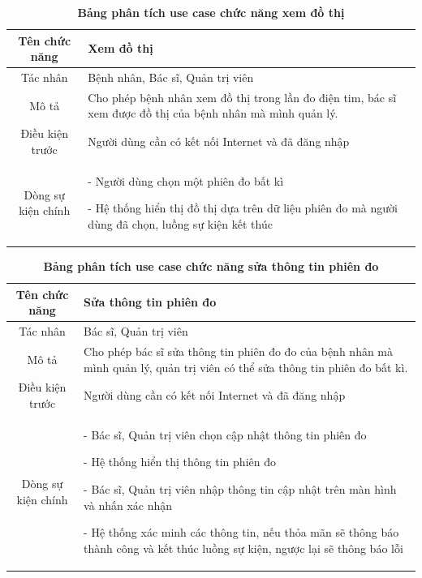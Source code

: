   \begin{table}[H]
    \caption{\bfseries \fontsize{12pt}{0pt}\selectfont Bảng phân tích use case chức năng xem đồ thị}
    \centering
    \begin{tabularx}{0.9\textwidth}{|c|X|}
      \hline
      \textbf{Tên chức năng} & \textbf{Xem đồ thị} \\
      \hline
      Tác nhân & Bệnh nhân, Bác sĩ, Quản trị viên \\
      \hline
      Mô tả & Cho phép bệnh nhân xem đồ thị trong lần đo điện tim, bác sĩ xem được đồ thị của bệnh nhân
      mà mình quản lý.\\
      \hline
      Điều kiện trước & Người dùng cần có kết nối Internet và đã đăng nhập \\
      \hline
      Dòng sự kiện chính & 
        - Người dùng chọn một phiên đo bất kì

        - Hệ thống hiển thị đồ thị dựa trên dữ liệu phiên đo mà người dùng đã chọn, luồng sự kiện 
        kết thúc        
        \\
      \hline
    \end{tabularx}
  \end{table}
  \begin{table}[H]
    \caption{\bfseries \fontsize{12pt}{0pt}\selectfont Bảng phân tích use case chức năng sửa thông tin phiên đo}
    \centering
    \begin{tabularx}{0.9\textwidth}{|c|X|}
      \hline
      \textbf{Tên chức năng} & \textbf{Sửa thông tin phiên đo} \\
      \hline
      Tác nhân & Bác sĩ, Quản trị viên \\
      \hline
      Mô tả & Cho phép bác sĩ sửa thông tin phiên đo đo của bệnh nhân
      mà mình quản lý, quản trị viên có thể sửa thông tin phiên đo bất kì.\\
      \hline
      Điều kiện trước & Người dùng cần có kết nối Internet và đã đăng nhập \\
      \hline
      Dòng sự kiện chính & 
        - Bác sĩ, Quản trị viên chọn cập nhật thông tin phiên đo

        - Hệ thống hiển thị thông tin phiên đo

        - Bác sĩ, Quản trị viên nhập thông tin cập nhật trên màn hình và nhấn xác nhận

        - Hệ thống xác minh các thông tin, nếu thỏa mãn sẽ thông báo thành công và kết thúc luồng sự kiện, ngược lại 
        sẽ thông báo lỗi          
        \\
      \hline
    \end{tabularx}
  \end{table}

